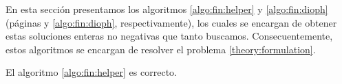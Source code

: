 En esta sección presentamos los algoritmos \ref{algo:fin:helper} y \ref{algo:fin:dioph} (páginas
\pageref{algo:fin:helper} y \ref{algo:fin:dioph}, respectivamente), los cuales
se encargan de obtener estas soluciones enteras no negativas que tanto buscamos. Consecuentemente,
estos algoritmos se encargan de resolver el problema \eqref{theory:formulation}.


\begin{theorem}
	\label{th:fin:helper:correct}
	El algoritmo \ref{algo:fin:helper} es correcto.
\end{theorem}
